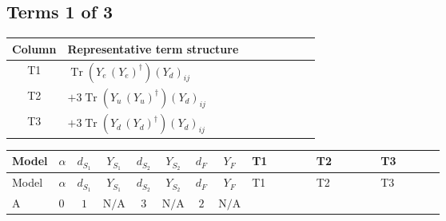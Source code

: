 \documentclass[8pt]{article}
\begin{document}
\begin{landscape}
\subsection*{Terms 1 of 3}
\begin{center}
\begin{tabular}{@{}c >{\raggedright\arraybackslash}p{0.82\linewidth}@{}}
\toprule
Column & Representative term structure \\
\midrule
T1 & \(\displaystyle \operatorname{Tr}\!\left({Y_e}\,\left({Y_e}\right)^{\dagger}\right) \left({Y_d}\right)_{ij}\) \\
\midrule
T2 & \(\displaystyle +3 \operatorname{Tr}\!\left({Y_u}\,\left({Y_u}\right)^{\dagger}\right) \left({Y_d}\right)_{ij}\) \\
\midrule
T3 & \(\displaystyle +3 \operatorname{Tr}\!\left({Y_d}\,\left({Y_d}\right)^{\dagger}\right) \left({Y_d}\right)_{ij}\) \\
\midrule
\bottomrule
\end{tabular}
\end{center}
\smallskip
\tiny
\begin{longtable}{@{}llcccccc >{\raggedright\arraybackslash}p{0.21\linewidth} >{\raggedright\arraybackslash}p{0.21\linewidth} >{\raggedright\arraybackslash}p{0.21\linewidth}@{}}
\toprule
Model & $\alpha$ & $d_{S_1}$ & $Y_{S_1}$ & $d_{S_2}$ & $Y_{S_2}$ & $d_F$ & $Y_F$ & T1 & T2 & T3 \\
\midrule
\endfirsthead
\toprule
Model & $\alpha$ & $d_{S_1}$ & $Y_{S_1}$ & $d_{S_2}$ & $Y_{S_2}$ & $d_F$ & $Y_F$ & T1 & T2 & T3 \\
\midrule
\endhead
A & $0$ & $1$ & $\text{N/A}$ & $3$ & $\text{N/A}$ & $2$ & $\text{N/A}$ & \scriptsize\adjustbox{max width=\linewidth}{$\begin{gathered} \operatorname{Tr}\!\left({Y_e}\,\left({Y_e}\right)^{\dagger}\right) \left({Y_d}\right)_{ij}\end{gathered}$} & \scriptsize\adjustbox{max width=\linewidth}{$\begin{gathered} +3 \operatorname{Tr}\!\left({Y_u}\,\left({Y_u}\right)^{\dagger}\right) \left({Y_d}\right)_{ij}\end{gathered}$} & \scriptsize\adjustbox{max width=\linewidth}{$\begin{gathered} +3 \operatorname{Tr}\!\left({Y_d}\,\left({Y_d}\right)^{\dagger}\right) \left({Y_d}\right)_{ij}\end{gathered}$} \\
\midrule

\end{longtable}
\end{landscape}
\end{document}
